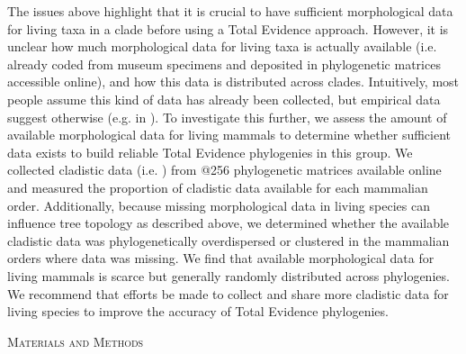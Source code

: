 \documentclass[12pt,letterpaper]{article}
\renewcommand{\section}[1]{%
\bigskip
\begin{center}
\begin{Large}
\normalfont\scshape #1
\medskip
\end{Large}
\end{center}}
\begin{document}
The issues above highlight that it is crucial to have sufficient morphological data for living taxa in a clade before using a Total Evidence approach.
However, it is unclear how much morphological data for living taxa is actually available (i.e. already coded from museum specimens and deposited in phylogenetic matrices accessible online), and how this data is distributed across clades.
Intuitively, most people assume this kind of data has already been collected, but empirical data suggest otherwise (e.g. in \cite{ronquista2012,slaterphylogenetic2013,beckancient2014}).
To investigate this further, we assess the amount of available morphological data for living mammals to determine whether sufficient data exists to build reliable Total Evidence phylogenies in this group.
We collected cladistic data (i.e. %
) from @256 phylogenetic matrices available online and measured the proportion of cladistic data available for each mammalian order.
Additionally, because missing morphological data in living species can influence tree topology as described above,%
we determined whether the available cladistic data was phylogenetically overdispersed or clustered in the mammalian orders where data was missing. 
We find that available morphological data for living mammals is scarce but generally randomly distributed across phylogenies. 
We recommend that efforts be made to collect and share more cladistic data for living species to improve the accuracy of Total Evidence phylogenies.

%
%
\section{Materials and Methods}
\end{document}

